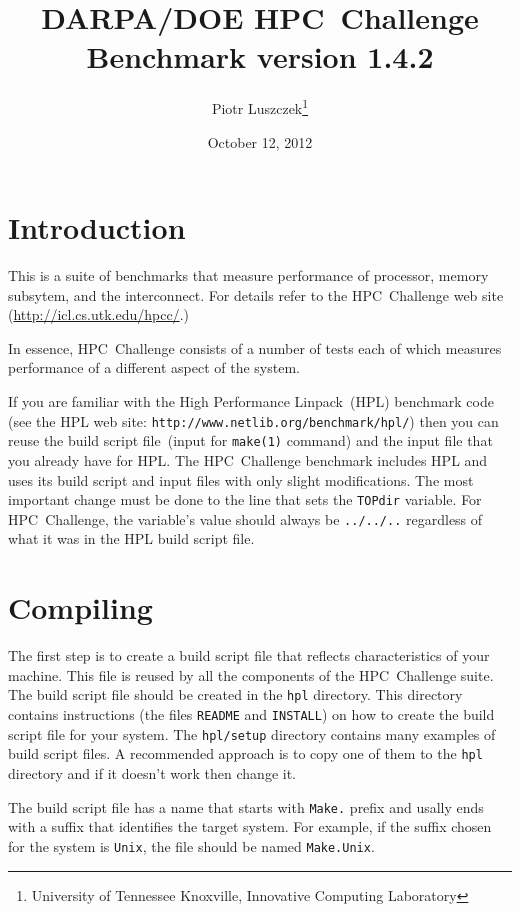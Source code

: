 \documentclass[twocolumn]{article}
\begin{document}
\title{DARPA/DOE HPC~Challenge Benchmark version 1.4.2}
\author{Piotr Luszczek\footnote{University of Tennessee Knoxville, Innovative
Computing Laboratory}}
\date{October 12, 2012}
\maketitle

\section{Introduction}
This is a suite of benchmarks that measure performance of processor,
memory subsytem, and the interconnect. For details refer to the
HPC~Challenge web site (\url{http://icl.cs.utk.edu/hpcc/}.)

In essence, HPC~Challenge consists of a number of tests each
of which measures performance of a different aspect of the system.

If you are familiar with the High Performance Linpack~(HPL) benchmark
code (see the HPL web site:
\texttt{http://www.netlib.org/benchmark/hpl/}) then you can reuse the
build script file~(input for \texttt{make(1)} command) and the input
file that you already have for HPL. The HPC~Challenge benchmark
includes HPL and uses its build script and input files with only
slight modifications. The most important change must be done to the
line that sets the \texttt{TOPdir} variable. For HPC~Challenge, the
variable's value should always be \texttt{../../..} regardless of what
it was in the HPL build script file.

\section{Compiling}
The first step is to create a build script file that reflects
characteristics of your machine. This file is reused by all the
components of the HPC~Challenge suite. The build script file should be
created in the \texttt{hpl} directory. This directory contains
instructions (the files \texttt{README} and \texttt{INSTALL}) on how
to create the build script file for your system. The
\texttt{hpl/setup} directory contains many examples of build script
files. A recommended approach is to copy one of them to the
\texttt{hpl} directory and if it doesn't work then change it.

The build script file has a name that starts with \texttt{Make.}
prefix and usally ends with a suffix that identifies the target
system. For example, if the suffix chosen for the system is
\texttt{Unix}, the file should be named \texttt{Make.Unix}.
\end{document}
